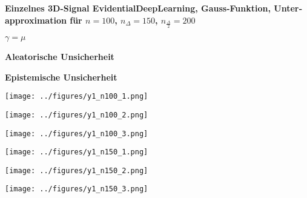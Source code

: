 \begin{otherlanguage}{ngerman}

\begin{samepage}
\begin{minipage}{\textwidth}

\noindent\textbf{Einzelnes 3D-Signal \gls{EvidentialDeepLearning}, Gauss-Funktion,
Unterapproximation für $n=100$, $n_{\Delta}=150$, $n_{\frac{\Delta}{2}}=200$}


\begin{minipage}{0.05\textwidth}\vspace{0.5cm}\end{minipage}%
\begin{minipage}{0.3\textwidth}\centering \textbf{$\gamma=\mu$}\end{minipage}%
\begin{minipage}{0.3\textwidth}\centering \textbf{Aleatorische Unsicherheit}\end{minipage}%
\begin{minipage}{0.3\textwidth}\centering \textbf{Epistemische Unsicherheit}\end{minipage}

\vspace{0.125cm}

\begin{minipage}{0.05\textwidth}\centering{}\end{minipage}%
\begin{minipage}{0.3\textwidth}\centering\texttt{[image: ../figures/y1\_n100\_1.png]}\end{minipage}%
\begin{minipage}{0.3\textwidth}\centering\texttt{[image: ../figures/y1\_n100\_2.png]}\end{minipage}%
\begin{minipage}{0.3\textwidth}\centering\texttt{[image: ../figures/y1\_n100\_3.png]}\end{minipage}

\vspace{0.125cm}

\begin{minipage}{0.05\textwidth}\centering{}\end{minipage}%
\begin{minipage}{0.3\textwidth}\centering\texttt{[image: ../figures/y1\_n150\_1.png]}\end{minipage}%
\begin{minipage}{0.3\textwidth}\centering\texttt{[image: ../figures/y1\_n150\_2.png]}\end{minipage}%
\begin{minipage}{0.3\textwidth}\centering\texttt{[image: ../figures/y1\_n150\_3.png]}\end{minipage}


\end{minipage}
\end{samepage}
\end{otherlanguage}
